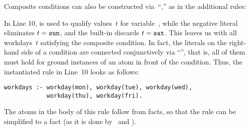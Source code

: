 \begin{example}
Composite conditions can also be constructed via~``\code{:},''
as in the additional rules:
%

%
In Line 10,
 is used to qualify values~$t$ for variable~,
while the negative literal 
eliminates $t=\texttt{sun}$, and the built-in 
discards $t=\texttt{sat}$.
This leaves us with all workdays~$t$ satisfying the composite condition.
In fact, the literals on the right-hand side of a condition are connected conjunctively via ``\code{,}'', that is,
all of them must hold for ground instances of an atom in front
of the condition.
Thus, the instantiated rule in Line~10 looks as follows:%
%
\begin{lstlisting}[numbers=none]
workdays :- workday(mon), workday(tue), workday(wed),
            workday(thu), workday(fri).
\end{lstlisting}
%
The atoms in the body of this rule follow from facts, so that
the rule can be simplified to a fact 
(as it is done by \clingo\ and \gringo).
\eexample
\end{example}


